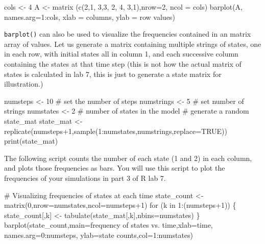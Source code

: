 \documentclass[
  letterpaper,
  DIV=11,
  numbers=noendperiod]{scrreprt}
\newenvironment{Shaded}{\begin{snugshade}}{\end{snugshade}}
\newcommand{\NormalTok}[1]{\textcolor[rgb]{0.00,0.23,0.31}{#1}}
\begin{document}
\begin{Shaded}
\begin{Highlighting}[]
\NormalTok{cols \textless{}{-} 4}
\NormalTok{A \textless{}{-} matrix (c(2,1, 3,3, 2, 4, 3,1),nrow=2, ncol = cols)}
\NormalTok{barplot(A, names.arg=1:cols, xlab = \textquotesingle{}columns\textquotesingle{}, ylab = \textquotesingle{}row values\textquotesingle{})}
\end{Highlighting}
\end{Shaded}

\texttt{barplot()} can also be used to visualize the frequencies
contained in an matrix array of values. Let us generate a matrix
containing multiple strings of states, one in each row, with initial
states all in column 1, and each successive column containing the states
at that time step (this is not how the actual matrix of states is
calculated in lab 7, this is just to generate a state matrix for
illustration.)

\begin{Shaded}
\begin{Highlighting}[]
\NormalTok{numsteps \textless{}{-} 10 \# set the number of steps}
\NormalTok{numstrings \textless{}{-} 5 \# set number of strings}
\NormalTok{numstates \textless{}{-} 2 \# number of states in the model}
\NormalTok{\# generate a random state\_mat }
\NormalTok{state\_mat \textless{}{-} replicate(numsteps+1,sample(1:numstates,numstrings,replace=TRUE))}
\NormalTok{print(state\_mat)}
\end{Highlighting}
\end{Shaded}

The following script counts the number of each state (1 and 2) in each
column, and plots those frequencies as bars. You will use this script to
plot the frequencies of your simulations in part 3 of R lab 7.

\begin{Shaded}
\begin{Highlighting}[]
\NormalTok{\# Visualizing frequencies of states at each time }
\NormalTok{state\_count \textless{}{-} matrix(0,nrow=numstates,ncol=numsteps+1)}
\NormalTok{for (k in 1:(numsteps+1)) \{}
\NormalTok{  state\_count[,k] \textless{}{-} tabulate(state\_mat[,k],nbins=numstates)}
\NormalTok{\}}
\NormalTok{barplot(state\_count,main=\textquotesingle{}frequency of states vs. time\textquotesingle{},xlab=\textquotesingle{}time\textquotesingle{}, names.arg=0:numsteps, ylab=\textquotesingle{}state counts\textquotesingle{},col=1:numstates)}
\end{Highlighting}
\end{Shaded}
\end{document}
